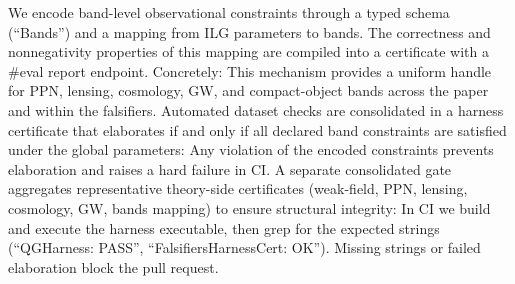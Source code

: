 \documentclass[aps,prd,twocolumn,superscriptaddress,nofootinbib,floatfix,longbibliography]{revtex4-2}
\newcommand{\lean}[1]{\texttt{\detokenize{#1}}}
\begin{document}
%
We encode band-level observational constraints through a typed schema (``Bands'') and a mapping from ILG parameters to bands. The correctness and nonnegativity properties of this mapping are compiled into a certificate with a \#eval report endpoint. Concretely:
This mechanism provides a uniform handle for PPN, lensing, cosmology, GW, and compact-object bands across the paper and within the falsifiers.
%
Automated dataset checks are consolidated in a harness certificate that elaborates if and only if all declared band constraints are satisfied under the global parameters:
Any violation of the encoded constraints prevents elaboration and raises a hard failure in CI.
%
A separate consolidated gate aggregates representative theory-side certificates (weak-field, PPN, lensing, cosmology, GW, bands mapping) to ensure structural integrity:
In CI we build and execute the harness executable, then grep for the expected strings (``QGHarness: PASS'', ``FalsifiersHarnessCert: OK''). Missing strings or failed elaboration block the pull request.
%
\end{document}
